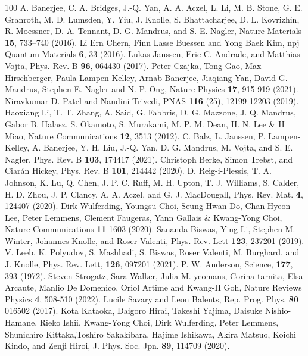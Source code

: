 \documentclass[aps,amsmath,twocolumn,amssymb,floatfix,showpacs,superscriptaddress,nofootinbib,longbibliography]{revtex4-1}
\begin{document}
\begin{thebibliography}{100}
A. Banerjee, C. A. Bridges, J.-Q. Yan, A. A. Aczel, L. Li, M. B. Stone, G. E. Granroth,
M. D. Lumsden, Y. Yiu, J. Knolle, S. Bhattacharjee, D. L. Kovrizhin, R. Moessner, D. A. Tennant,
D. G. Mandrus, and S. E. Nagler, Nature Materials {\bf 15}, 733–740 (2016).
Li Ern Chern, Finn Lasse Buessen and Yong Baek Kim, npj Quantum Materials {\bf 6}, 33 (2016).
Lukas Janssen, Eric C. Andrade,  and Matthias Vojta, Phys. Rev. B {\bf 96}, 064430 (2017).
 Peter Czajka, Tong Gao, Max Hirschberger, Paula Lampen-Kelley, Arnab Banerjee, Jiaqiang Yan, David G. Mandrus, Stephen E. Nagler and N. P. Ong, Nature Physics {\bf 17}, 915-919 (2021).
Niravkumar D. Patel and Nandini Trivedi, PNAS {\bf 116} (25), 12199-12203 (2019).
 Haoxiang Li, T. T. Zhang, A. Said, G. Fabbris, D. G. Mazzone, J. Q. Mandrus, Gabor B. Halasz, S. Okamoto, S. Murakami, M. P. M. Dean, H. N. Lee \& H Miao, Nature Communications {\bf 12}, 3513 (2012).
C. Balz, L. Janssen, P. Lampen-Kelley, A. Banerjee, Y. H. Liu, J.-Q. Yan, D. G. Mandrus, M. Vojta, and S. E. Nagler, Phys. Rev. B {\bf 103}, 174417 (2021).
Christoph Berke, Simon Trebst, and Ciarán Hickey, Phys. Rev. B {\bf 101}, 214442 (2020).
 D. Reig-i-Plessis, T. A. Johnson, K. Lu, Q. Chen, J. P. C. Ruff, M. H. Upton, T. J. Williams, S. Calder, H. D. Zhou, J. P. Clancy, A. A. Aczel, and G. J. MacDougall, Phys. Rev. Mat. {\bf 4}, 124407 (2020).
Dirk Wulferding, Youngsu Choi, Seung-Hwan Do, Chan Hyeon Lee, Peter Lemmens, Clement Faugeras, Yann Gallais \& Kwang-Yong Choi,
Nature Communications {\bf 11} 1603 (2020).
Sananda Biswas, Ying Li, Stephen M. Winter, Johannes Knolle, and Roser Valenti, Phys. Rev. Lett {\bf 123}, 237201 (2019).
V. Leeb, K. Polyudov, S. Mashhadi, S. Biswas,  Roser Valenti,  M. Burghard, and J. Knolle, Phys. Rev. Lett, {\bf 126}, 097201 (2021).
P. W. Anderson, Science, {\bf 177}, 393 (1972).
Steven Strogatz, Sara Walker, Julia M. yeomans, Corina tarnita, Elsa Arcaute, Manlio De Domenico, Oriol Artime and Kwang-II Goh, Nature Reviews Physics {\bf 4}, 508-510 (2022). 
Lucile Savary and Leon Balents, Rep. Prog. Phys. {\bf 80} 016502 (2017).
Kota Kataoka, Daigoro Hirai, Takeshi Yajima, Daisuke Nishio-Hamane, Rieko Ishii, Kwang-Yong Choi, Dirk Wulferding, Peter Lemmens, Shunichiro Kittaka,Toshiro Sakakibara, Hajime Ishikawa, Akira Matsuo, Koichi Kindo, and Zenji Hiroi,  J. Phys. Soc. Jpn. {\bf 89}, 114709 (2020).

\end{thebibliography}
\end{document}
